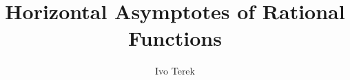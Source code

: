 \documentclass{ximera}
\author{Ivo Terek}
\title{Horizontal Asymptotes of Rational Functions}
\begin{document}
\licenseSZ
\begin{abstract}
\end{abstract}
\maketitle


%
%
%
%
%
%
%
\end{document}
